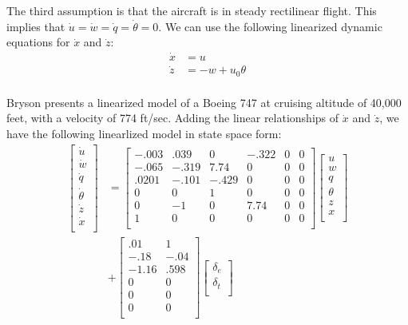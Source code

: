 The third assumption is that the aircraft is in steady rectilinear
flight. This implies that $\dot u = \dot w = \dot q = \dot \theta =
0$. We can use the following linearized dynamic equations for $\dot x$
and $\dot z$:
\begin{align*}
  \dot x &= u \\
  \dot z &= -w + u_0 \theta \\
\end{align*}

Bryson \cite{bryson2015control} presents a linearized model of a
Boeing 747 at cruising altitude of 40,000 feet, with a velocity of
774 ft/sec. Adding the linear relationships of $\dot x$ and $\dot z$,
we have the following linearlized model in state space form:
\begin{align*}
  \begin{bmatrix}
    \dot u \\
    \dot w \\
    \dot q \\
    \dot \theta \\
    \dot z \\
    \dot x \\
  \end{bmatrix}
  &=
  \begin{bmatrix}
    -.003 & .039 & 0 & -.322 & 0 & 0 \\
    -.065 & -.319 & 7.74 & 0 & 0 & 0 \\
    .0201 & -.101 & -.429 & 0 & 0 & 0\\
    0 & 0 & 1 & 0 & 0 & 0 \\
    0 & -1 & 0 & 7.74 & 0 & 0 \\
    1 & 0 & 0 & 0 & 0 & 0 \\
  \end{bmatrix} 
  \begin{bmatrix}
    u \\
    w \\
    q \\
    \theta \\
    z \\
    x \\
  \end{bmatrix} \\
  &+  
  \begin{bmatrix}
    .01 & 1 \\
    -.18 & -.04 \\
    -1.16 & .598 \\
    0 & 0 \\
    0 & 0 \\
    0 & 0 \\
  \end{bmatrix}
  \begin{bmatrix}
    \delta_{e} \\
    \delta_{t} \\
  \end{bmatrix} \\
\end{align*}

